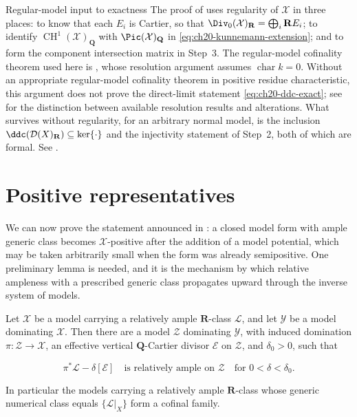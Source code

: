 \noindent\begin{minipage}{\textwidth}
\begin{warning}{Regular-model input to exactness}
The proof of  uses regularity of $\mathcal X$ in
three places: to know that each $E_i$ is Cartier, so that
$\Div_0(\mathcal X)_{\mathbf R}=\bigoplus_i\mathbf R E_i$; to identify
$\operatorname{CH}^1(\mathcal X)_{\mathbf Q}$ with
$\Pic(\mathcal X)_{\mathbf Q}$ in
\eqref{eq:ch20-kunnemann-extension}; and to form the component
intersection matrix in Step~3.  The regular-model cofinality theorem used
here is , whose resolution argument assumes
$\operatorname{char}k=0$.  Without an appropriate regular-model
cofinality theorem in positive residue characteristic, this argument does
not prove the direct-limit statement \eqref{eq:ch20-ddc-exact}; see
 for the distinction between available
resolution results and alterations.  What survives without
regularity, for an arbitrary normal model, is the inclusion
$\ddc(\mathcal D(X)_{\mathbf R})\subseteq\ker\{\cdot\}$ and the injectivity
statement of Step~2, both of which are formal.  See
.
\end{warning}
\end{minipage}\par

\section{Positive representatives}
\label{sec:ch20-positive-representative}

We can now prove the statement announced in
: a closed model form with ample generic
class becomes $\mathcal X$-positive after the addition of a model
potential, which may be taken arbitrarily small when the form was already
semipositive.  One preliminary lemma is needed, and it is the mechanism by
which relative ampleness with a prescribed generic class propagates upward
through the inverse system of models.

\begin{lemma}
\label{lem:ch20-ample-propagation}
Let $\mathcal X$ be a model carrying a relatively ample
$\mathbf R$-class $\mathcal L$, and let $\mathcal Y$ be a model
dominating $\mathcal X$.  Then there are a model $\mathcal Z$ dominating
$\mathcal Y$, with induced domination $\pi:\mathcal Z\to\mathcal X$, an
effective vertical $\mathbf Q$-Cartier divisor $\mathcal E$ on
$\mathcal Z$, and $\delta_0>0$, such that

\begin{equation}
\label{eq:ch20-ample-propagation}
 \pi^*\mathcal L-\delta[\mathcal E]
 \quad\text{is relatively ample on }\mathcal Z
 \quad\text{for }0<\delta<\delta_0 .
\end{equation}

In particular the models carrying a relatively ample $\mathbf R$-class
whose generic numerical class equals $\{\mathcal L|_X\}$ form a cofinal
family.
\end{lemma}

